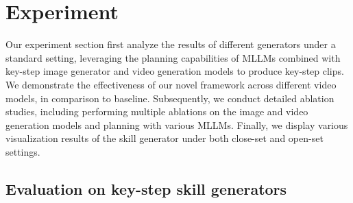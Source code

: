 \section{Experiment}
\label{sec:exp}
Our experiment section first analyze the results of different generators under a standard setting, leveraging the planning capabilities of MLLMs combined with key-step image generator and video generation models to produce key-step clips. We demonstrate the effectiveness of our novel framework across different video models, in comparison to baseline. Subsequently, we conduct detailed ablation studies, including performing multiple ablations on the image and video generation models and planning with various MLLMs. Finally, we display various visualization results of the skill generator under both close-set and open-set settings.

\subsection{Evaluation on key-step skill generators}

\begin{table}[t]
\centering
{}
\caption{Evaluation on baseline methods. We evaluate different video models under different settings based on step descriptions generated by a multimodal LLM. ``Gen" refers to using the GenHowTo model, ``SDXL" refers to using SDXL model with IP-Adapter plus, and ``Ours" denotes using the KIG model to generate key-step images.}
\label{tab:overview}
\vspace{-15pt}
\end{table}

